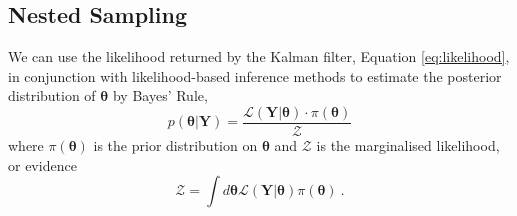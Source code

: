 \documentclass[fleqn,usenatbib,useAMS]{mnras}
\begin{document}
\subsection{Nested Sampling}\label{sec:nested_sampling}
We can use the likelihood returned by the Kalman filter, Equation \eqref{eq:likelihood}, in conjunction with likelihood-based inference methods to estimate the posterior distribution of $\boldsymbol{\theta}$ by Bayes' Rule,
\begin{equation}
	p(\boldsymbol{\theta} | \boldsymbol{Y}) = \frac{\mathcal{L}(\boldsymbol{Y} | \boldsymbol{\theta}) \cdot \pi(\boldsymbol{\theta})}{\mathcal{Z}}
\end{equation}
where $\pi(\boldsymbol{\theta})$ is the prior distribution on $\boldsymbol{\theta}$ and $\mathcal{Z}$ is the marginalised likelihood, or evidence
\begin{equation}
	\mathcal{Z} = \int d \boldsymbol{\theta} \mathcal{L}(\boldsymbol{Y} | \boldsymbol{\theta})  \pi(\boldsymbol{\theta})  \ . \label{eq:model_evidence}
\end{equation}
\end{document}
